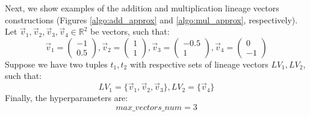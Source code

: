 \begin{runexample}
    Next, we show examples of the addition and multiplication lineage vectors constructions (Figures \ref{algo:add_approx} and
\ref{algo:mul_approx}, respectively).
    Let $\vec v_1, \vec v_2, \vec v_3, \vec v_4 \in \mathbb{R}^2$ be vectors, such that:
    \begin{equation*}
        \vec v_1 = \begin{pmatrix} -1\\ 0.5 \end{pmatrix},
        \vec v_2 = \begin{pmatrix} 1\\ 1 \end{pmatrix},
        \vec v_3 = \begin{pmatrix} -0.5\\ 1 \end{pmatrix},
        \vec v_4 = \begin{pmatrix} 0\\ -1 \end{pmatrix}
    \end{equation*}
    Suppose we have two tuples $t_1, t_2$ with respective sets of lineage vectors $LV_1, LV_2$, such that:
    \begin{equation*}
        LV_1 = \{\vec v_1, \vec v_2, \vec v_3\}, LV_2 = \{\vec v_4\}
    \end{equation*}
    Finally, the hyperparameters are:
    \begin{equation*}
        max\_vectors\_num = 3
    \end{equation*}
\end{runexample}
